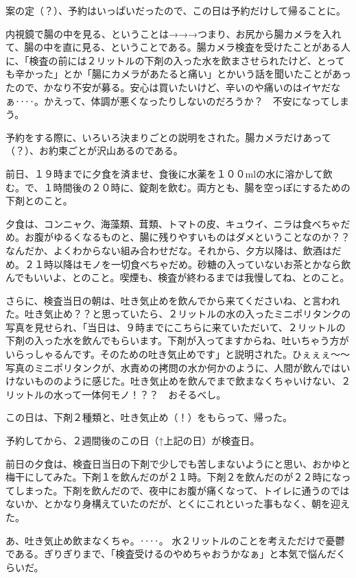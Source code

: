 案の定（？）、予約はいっぱいだったので、この日は予約だけして帰ることに。


内視鏡で腸の中を見る、ということは→→→つまり、お尻から腸カメラを入れて、腸の中を直に見る、ということである。腸カメラ検査を受けたことがある人に、「検査の前には２リットルの下剤の入った水を飲まさせられたけど、とっても辛かった」とか「腸にカメラがあたると痛い」とかいう話を聞いたことがあったので、かなり不安が募る。安心は買いたいけど、辛いのや痛いのはイヤだなぁ‥‥。かえって、体調が悪くなったりしないのだろうか？　不安になってしまう。

予約をする際に、いろいろ決まりごとの説明をされた。腸カメラだけあって（？）、お約束ごとが沢山あるのである。

前日、１９時までに夕食を済ませ、食後に水薬を１００mlの水に溶かして飲む。で、１時間後の２０時に、錠剤を飲む。両方とも、腸を空っぽにするための下剤とのこと。

夕食は、コンニャク、海藻類、茸類、トマトの皮、キュウイ、ニラは食べちゃだめ。お腹がゆるくなるものと、腸に残りやすいものはダメということなのか？？　なんだか、よくわからない組み合わせだな。それから、夕方以降は、飲酒はだめ。２１時以降はモノを一切食べちゃだめ。砂糖の入っていないお茶とかなら飲んでもいいよ、とのこと。喫煙も、検査が終わるまでは我慢してね、とのこと。

さらに、検査当日の朝は、吐き気止めを飲んでから来てくださいね、と言われた。吐き気止め？？と思っていたら、２リットルの水の入ったミニポリタンクの写真を見せられ、「当日は、９時までにこちらに来ていただいて、２リットルの下剤の入った水を飲んでもらいます。下剤が入ってますからね、吐いちゃう方がいらっしゃるんです。そのための吐き気止めです」と説明された。ひぇぇぇ～～　写真のミニポリタンクが、水責めの拷問の水か何かのように、人間が飲んではいけないもののように感じた。吐き気止めを飲んでまで飲まなくちゃいけない、２リットルの水って一体何モノ！？？　おそるべし。

この日は、下剤２種類と、吐き気止め（！）をもらって、帰った。


予約してから、２週間後のこの日（↑上記の日）が検査日。

前日の夕食は、検査日当日の下剤で少しでも苦しまないようにと思い、おかゆと梅干にしてみた。下剤１を飲んだのが２１時。下剤２を飲んだのが２２時になってしまった。下剤を飲んだので、夜中にお腹が痛くなって、トイレに通うのではないか、とかなり身構えていたのだが、とくにこれといった事もなく、朝を迎えた。

あ、吐き気止め飲まなくちゃ。‥‥。
水２リットルのことを考えただけで憂鬱である。ぎりぎりまで、「検査受けるのやめちゃおうかなぁ」と本気で悩んだくらいだ。

